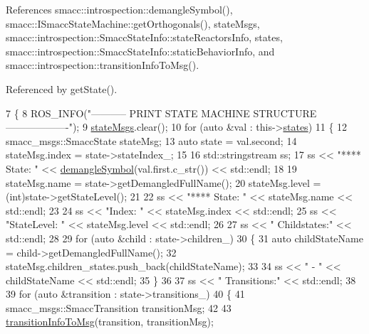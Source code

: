 References smacc\+::introspection\+::demangle\+Symbol(), smacc\+::\+I\+Smacc\+State\+Machine\+::get\+Orthogonals(), state\+Msgs, smacc\+::introspection\+::\+Smacc\+State\+Info\+::state\+Reactors\+Info, states, smacc\+::introspection\+::\+Smacc\+State\+Info\+::static\+Behavior\+Info, and smacc\+::introspection\+::transition\+Info\+To\+Msg().



Referenced by get\+State().


\begin{DoxyCode}
7 \{
8     ROS\_INFO(\textcolor{stringliteral}{"----------- PRINT STATE MACHINE STRUCTURE -------------------"});
9     \hyperlink{classsmacc_1_1introspection_1_1SmaccStateMachineInfo_a48e3ff7bbe2673d23e6942234446ebee}{stateMsgs}.clear();
10     \textcolor{keywordflow}{for} (\textcolor{keyword}{auto} &val : this->\hyperlink{classsmacc_1_1introspection_1_1SmaccStateMachineInfo_aef31d74ad3669f0b0f57fe0e008cd2f8}{states})
11     \{
12         smacc\_msgs::SmaccState stateMsg;
13         \textcolor{keyword}{auto} state = val.second;
14         stateMsg.index = state->stateIndex\_;
15 
16         std::stringstream ss;
17         ss << \textcolor{stringliteral}{"**** State: "} << \hyperlink{namespacesmacc_1_1introspection_a2f495108db3e57604d8d3ff5ef030302}{demangleSymbol}(val.first.c\_str()) << std::endl;
18 
19         stateMsg.name = state->getDemangledFullName();
20         stateMsg.level = (int)state->getStateLevel();
21 
22         ss << \textcolor{stringliteral}{"**** State: "} << stateMsg.name << std::endl;
23 
24         ss << \textcolor{stringliteral}{"Index: "} << stateMsg.index << std::endl;
25         ss << \textcolor{stringliteral}{"StateLevel: "} << stateMsg.level << std::endl;
26 
27         ss << \textcolor{stringliteral}{" Childstates:"} << std::endl;
28 
29         \textcolor{keywordflow}{for} (\textcolor{keyword}{auto} &child : state->children\_)
30         \{
31             \textcolor{keyword}{auto} childStateName = child->getDemangledFullName();
32             stateMsg.children\_states.push\_back(childStateName);
33 
34             ss << \textcolor{stringliteral}{" - "} << childStateName << std::endl;
35         \}
36 
37         ss << \textcolor{stringliteral}{" Transitions:"} << std::endl;
38 
39         \textcolor{keywordflow}{for} (\textcolor{keyword}{auto} &transition : state->transitions\_)
40         \{
41             smacc\_msgs::SmaccTransition transitionMsg;
42 
43             \hyperlink{namespacesmacc_1_1introspection_a6c1b51c4d44fd5e41fe218f1ee150681}{transitionInfoToMsg}(transition, transitionMsg);

\end{DoxyCode}
